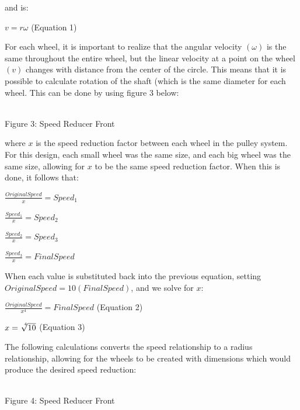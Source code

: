 \documentclass{article}
\begin{document}
and is:
\begin{center}
$ v = r\omega $ (Equation 1)
\end{center}

For each wheel, it is important to realize that the angular velocity $(\omega)$ is the same throughout the entire wheel, but the linear velocity at a point on the wheel $(v)$ changes with distance from the center of the circle. This means that it is possible to calculate rotation of the shaft (which is the same diameter for each wheel. This can be done by using figure 3 below:

\begin{center}
\\
\scriptsize{
Figure 3: Speed Reducer Front
}
\end{center}

where $x$ is the speed reduction factor between each wheel in the pulley system. For this design, each small wheel was the same size, and each big wheel was the same size, allowing for $x$ to be the same speed reduction factor. When this is done, it follows that:
\begin{center}
$\frac{Original Speed}{x} = Speed_1$\vspace{0.18in}

$\frac{Speed_1}{x} = Speed_2$\vspace{0.18in}

$\frac{Speed_2}{x} = Speed_3$\vspace{0.18in}

$\frac{Speed_3}{x} = Final Speed$
\end{center}

When each value is substituted back into the previous equation, setting $Original Speed = 10(Final Speed)$, and we solve for $x$:

\begin{center}
$\frac{Original Speed}{x^4} = Final Speed$ (Equation 2)\vspace{0.18in}

          $x = \sqrt[\leftroot{-3}\uproot{3}4]{10}$          (Equation 3)
\end{center}

The following calculations converts the speed relationship to a radius relationship, allowing for the wheels to be created with dimensions which would produce the desired speed reduction:

\begin{center}
\\
\scriptsize{
Figure 4: Speed Reducer Front
}
\end{center}
\end{document}
